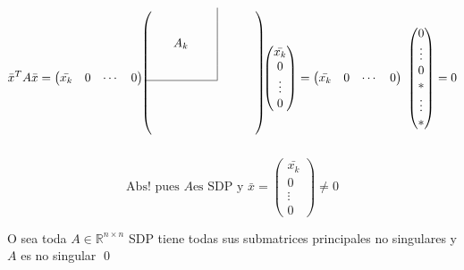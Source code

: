 \begin{itemize}
\begin{equation}
 \bar{x}^{T} A \bar{x} = \begin{pmatrix} \bar{x_{k}} & 0 & \cdots & 0 \end{pmatrix}
  \begin{blockarray}{ccccc|cccc}
    \begin{block}{(ccccc|cccc@{\hspace*{5pt}})}
	\BAmulticolumn{5}{c|}{\multirow{5}{*}{$A_{k}$}}&\BAmulticolumn{4}{c}{\multirow{5}{*}{}}\\
    &&&&&&&\\
    &&&&&&&\\
    &&&&&&&\\
    &&&&&&&\\
    \cline{1-5}%
    \BAmulticolumn{5}{c}{\multirow{4}{*}{}}&\BAmulticolumn{4}{c}{\multirow{4}{*}{}}\\
    \BAmulticolumn{5}{c}{\multirow{4}{*}{}}&\BAmulticolumn{4}{c}{\multirow{4}{*}{}}\\
    \BAmulticolumn{5}{c}{\multirow{4}{*}{}}&\BAmulticolumn{4}{c}{\multirow{4}{*}{}}\\
    \BAmulticolumn{5}{c}{\multirow{4}{*}{}}&\BAmulticolumn{4}{c}{\multirow{4}{*}{}}\\
    \end{block}
  \end{blockarray}
  \begin{pmatrix} \bar{x_{k}} \\ 0 \\ \vdots \\ 0 \end{pmatrix} =
  \begin{pmatrix} \bar{x_{k}} & 0 & \cdots & 0 \end{pmatrix}   \ \begin{pmatrix} 0 \\ \vdots \\ 0 \\ * \\ \vdots \\ * \end{pmatrix} = 0
\end{equation}
\[\text{Abs! pues } A \text{es SDP y } \bar{x} = \begin{pmatrix} \bar{x_{k}} \\ 0 \\ \vdots \\ 0 \end{pmatrix} \neq 0\]

O sea toda $A \in \mathbb{R}^{n \times n}$ SDP tiene todas sus submatrices principales no singulares y $A$ es no singular \qed

\end{itemize}

